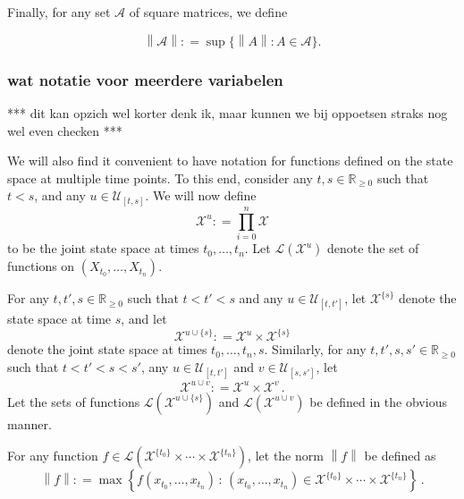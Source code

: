 \documentclass[10pt]{paper}
\theoremstyle{definition}
\newcommand{\reals}{\mathbb{R}}
\newcommand{\realsnonneg}{\reals_{\geq 0}}
\newcommand{\states}{\mathcal{X}}
\newcommand{\gambles}{\mathcal{L}}
\newcommand{\norm}[1]{\left\lVert #1 \right\rVert}
\newcommand{\coloneqq}{:\!=}
\begin{document}
\noindent
Finally, for any set $\mathcal{A}$ of square matrices, we define

\begin{equation*}
\norm{\mathcal{A}}\coloneqq\sup\{\norm{A}\colon A\in\mathcal{A}\}.
\end{equation*}

\subsubsection{wat notatie voor meerdere variabelen}\label{sec:multivar_notation}

*** dit kan opzich wel korter denk ik, maar kunnen we bij oppoetsen straks nog wel even checken ***

We will also find it convenient to have notation for functions defined on the state space at multiple time points.
To this end, consider any $t,s\in\realsnonneg$ such that $t<s$, and any $u\in\mathcal{U}_{[t,s]}$. We will now define
\begin{equation*}
\states^u\coloneqq \prod_{i=0}^n\states
\end{equation*}
to be the joint state space at times $t_0,\ldots,t_n$. Let $\gambles(\states^u)$ denote the set of functions on $(X_{t_0},\ldots,X_{t_n})$.

For any $t,t',s\in\realsnonneg$ such that $t<t'<s$ and any $u\in\mathcal{U}_{[t,t']}$, let $\states^{\{s\}}$ denote the state space at time $s$, and let
\begin{equation*}
\states^{u\cup\{s\}} \coloneqq \states^u\times\states^{\{s\}}
\end{equation*}
denote the joint state space at times $t_0,\ldots,t_n,s$. Similarly, for any $t,t',s,s'\in\realsnonneg$ such that $t<t'<s<s'$, any $u\in\mathcal{U}_{[t,t']}$ and $v\in\mathcal{U}_{[s,s']}$, let
\begin{equation*}
\states^{u\cup v}\coloneqq\states^u\times\states^v\,.
\end{equation*}
Let the sets of functions $\gambles(\states^{u\cup\{s\}})$ and $\gambles(\states^{u\cup v})$ be defined in the obvious manner.

For any function $f\in\gambles(\states^{\{t_0\}}\times\cdots\times\states^{\{t_n\}})$, let the norm $\norm{f}$ be defined as
\begin{equation*}
\norm{f} \coloneqq \max\left\{ f(x_{t_0},\ldots,x_{t_n})\,:\,(x_{t_0},\ldots,x_{t_n})\in \states^{\{t_0\}}\times\cdots\times\states^{\{t_n\}}\right\}\,.
\end{equation*}
\end{document}
